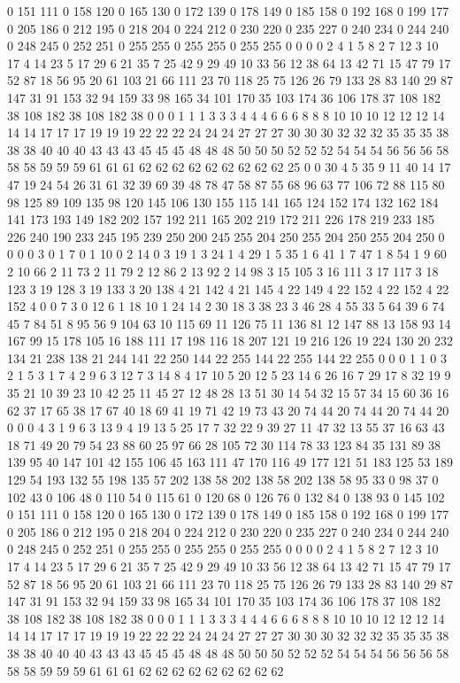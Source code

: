 0 151 111 0 158 120 0 165 130 0 172 139 0 178 149 0 185 158 0 192 168 0 199 177 0 205 186 0 212 195 0 218 204 0 224 212 0 230 220 0 235 227 0 240 234 0 244 240 0 248 245 0 252 251 0 255 255 0 255 255 0 255 255 0 0 0 0 2 4 1 5 8 2 7 12 3 10 17 4 14 23 5 17 29 6 21 35 7 25 42 9 29 49 10 33 56 12 38 64 13 42 71 15 47 79 17 52 87 18 56 95 20 61 103 21 66 111 23 70 118 25 75 126 26 79 133 28 83 140 29 87 147 31 91 153 32 94 159 33 98 165 34 101 170 35 103 174 36 106 178 37 108 182 38 108 182 38 108 182 38 0 0 0 1 1 1 3 3 3 4 4 4 6 6 6 8 8 8 10 10 10 12 12 12 14 14 14 17 17 17 19 19 19 22 22 22 24 24 24 27 27 27 30 30 30 32 32 32 35 35 35 38 38 38 40 40 40 43 43 43 45 45 45 48 48 48 50 50 50 52 52 52 54 54 54 56 56 56 58 58 58 59 59 59 61 61 61 62 62 62 62 62 62 62 62 62 
25 0 0 30 4 5 35 9 11 40 14 17 47 19 24 54 26 31 61 32 39 69 39 48 78 47 58 87 55 68 96 63 77 106 72 88 115 80 98 125 89 109 135 98 120 145 106 130 155 115 141 165 124 152 174 132 162 184 141 173 193 149 182 202 157 192 211 165 202 219 172 211 226 178 219 233 185 226 240 190 233 245 195 239 250 200 245 255 204 250 255 204 250 255 204 250 0 0 0 0 3 0 1 7 0 1 10 0 2 14 0 3 19 1 3 24 1 4 29 1 5 35 1 6 41 1 7 47 1 8 54 1 9 60 2 10 66 2 11 73 2 11 79 2 12 86 2 13 92 2 14 98 3 15 105 3 16 111 3 17 117 3 18 123 3 19 128 3 19 133 3 20 138 4 21 142 4 21 145 4 22 149 4 22 152 4 22 152 4 22 152 4 0 0 7 3 0 12 6 1 18 10 1 24 14 2 30 18 3 38 23 3 46 28 4 55 33 5 64 39 6 74 45 7 84 51 8 95 56 9 104 63 10 115 69 11 126 75 11 136 81 12 147 88 13 158 93 14 167 99 15 178 105 16 188 111 
17 198 116 18 207 121 19 216 126 19 224 130 20 232 134 21 238 138 21 244 141 22 250 144 22 255 144 22 255 144 22 255 0 0 0 1 1 0 3 2 1 5 3 1 7 4 2 9 6 3 12 7 3 14 8 4 17 10 5 20 12 5 23 14 6 26 16 7 29 17 8 32 19 9 35 21 10 39 23 10 42 25 11 45 27 12 48 28 13 51 30 14 54 32 15 57 34 15 60 36 16 62 37 17 65 38 17 67 40 18 69 41 19 71 42 19 73 43 20 74 44 20 74 44 20 74 44 20 0 0 0 4 3 1 9 6 3 13 9 4 19 13 5 25 17 7 32 22 9 39 27 11 47 32 13 55 37 16 63 43 18 71 49 20 79 54 23 88 60 25 97 66 28 105 72 30 114 78 33 123 84 35 131 89 38 139 95 40 147 101 42 155 106 45 163 111 47 170 116 49 177 121 51 183 125 53 189 129 54 193 132 55 198 135 57 202 138 58 202 138 58 202 138 58 95 33 0 98 37 0 102 43 0 106 48 0 110 54 0 115 61 0 120 68 0 126 76 0 132 84 0 138 93 0 145 102 
0 151 111 0 158 120 0 165 130 0 172 139 0 178 149 0 185 158 0 192 168 0 199 177 0 205 186 0 212 195 0 218 204 0 224 212 0 230 220 0 235 227 0 240 234 0 244 240 0 248 245 0 252 251 0 255 255 0 255 255 0 255 255 0 0 0 0 2 4 1 5 8 2 7 12 3 10 17 4 14 23 5 17 29 6 21 35 7 25 42 9 29 49 10 33 56 12 38 64 13 42 71 15 47 79 17 52 87 18 56 95 20 61 103 21 66 111 23 70 118 25 75 126 26 79 133 28 83 140 29 87 147 31 91 153 32 94 159 33 98 165 34 101 170 35 103 174 36 106 178 37 108 182 38 108 182 38 108 182 38 0 0 0 1 1 1 3 3 3 4 4 4 6 6 6 8 8 8 10 10 10 12 12 12 14 14 14 17 17 17 19 19 19 22 22 22 24 24 24 27 27 27 30 30 30 32 32 32 35 35 35 38 38 38 40 40 40 43 43 43 45 45 45 48 48 48 50 50 50 52 52 52 54 54 54 56 56 56 58 58 58 59 59 59 61 61 61 62 62 62 62 62 62 62 62 62 
